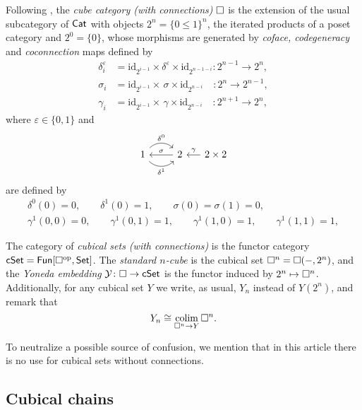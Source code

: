 Following \cite{brown1981cubes}, the \textit{cube category (with connections)} $\square$ is the extension of the usual subcategory of $\mathsf{Cat}$ with objects $2^n = \{0 \leq 1\}^n$, the iterated products of a poset category and $2^0 = \{0\}$, whose morphisms are generated by \textit{coface, codegeneracy} and \textit{coconnection} maps defined by
\begin{align*}
\delta_i^\varepsilon & =
\mathrm{id}_{2^{i-1}} \times \delta^\varepsilon \times \mathrm{id}_{2^{n-1-i}} \colon 2^{n-1} \to 2^n, \\
\sigma_i & =
\mathrm{id}_{2^{i-1}} \times \, \sigma \times \mathrm{id}_{2^{n-i}} \quad \colon 2^{n} \to 2^{n-1}, \\
\gamma_i & =
\mathrm{id}_{2^{i-1}} \times \, \gamma \times \mathrm{id}_{2^{n-i}} \quad \colon 2^{n+1} \to 2^{n},
\end{align*}
where $\varepsilon \in \{0,1\}$ and
\[
\begin{tikzcd}
1 \arrow[r, out=45, in=135, "\delta^0"] \arrow[r, out=-45, in=-135, "\delta^1"'] & 2 \arrow[l, "\sigma"'] &[-10pt] \arrow[l, "\gamma"'] 2 \times 2
\end{tikzcd}
\]
are defined by
\begin{gather*}
\delta^0(0) = 0, \qquad
\delta^1(0) = 1, \qquad
\sigma(0) = \sigma(1) = 0, \qquad \\
\gamma^1(0,0) = 0, \qquad
\gamma^1(0,1) = 1, \qquad
\gamma^1(1,0) = 1, \qquad
\gamma^1(1,1) = 1,
\end{gather*}

The category of \textit{cubical sets (with connections)} is the functor category $\mathsf{cSet} = \mathsf{Fun}[\square^{\mathrm{op}}, \mathsf{Set}]$.
The \textit{standard $n$-cube} is the cubical set $\square^n = \square(-, 2^n)$, and the \textit{Yoneda embedding} $\mathcal{Y} \colon \square \to \mathsf{cSet}$ is the functor induced by $2^n \mapsto \square^n$.
Additionally, for any cubical set $Y$ we write, as usual, $Y_n$ instead of $Y(2^n)$, and remark that
\[
Y_n \cong \operatorname*{colim}_{\square^n \to Y} \square^n.
\]

To neutralize a possible source of confusion, we mention that in this article there is no use for cubical sets without connections.

\subsection{Cubical chains}

